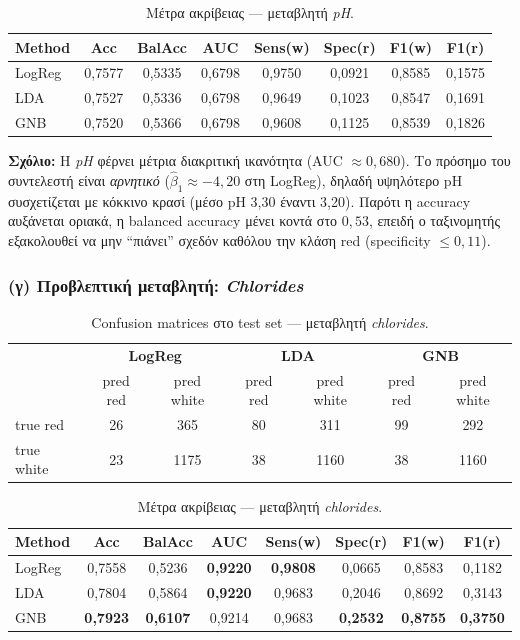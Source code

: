 \documentclass[11pt,a4paper]{article}
\begin{document}
\begin{table}[h!]
\centering
\caption{Μέτρα ακρίβειας — μεταβλητή \textit{pH}.}
\begin{tabular}{lccccccc}
\toprule
Method & Acc & BalAcc & AUC & Sens(w) & Spec(r) & F1(w) & F1(r) \\
\midrule
LogReg & 0,7577 & 0,5335 & 0,6798 & 0,9750 & 0,0921 & 0,8585 & 0,1575 \\
LDA    & 0,7527 & 0,5336 & 0,6798 & 0,9649 & 0,1023 & 0,8547 & 0,1691 \\
GNB    & 0,7520 & 0,5366 & 0,6798 & 0,9608 & 0,1125 & 0,8539 & 0,1826 \\
\bottomrule
\end{tabular}
\end{table}

\noindent
\textbf{Σχόλιο:} Η \textit{pH} φέρνει μέτρια διακριτική ικανότητα
(AUC $\approx 0{,}680$). Το πρόσημο του συντελεστή είναι \emph{αρνητικό}
($\hat{\beta}_1 \approx -4{,}20$ στη LogReg), δηλαδή υψηλότερο pH συσχετίζεται
με κόκκινο κρασί (μέσο pH 3,30 έναντι 3,20). Παρότι η accuracy
αυξάνεται οριακά, η balanced accuracy μένει κοντά στο $0{,}53$, επειδή ο
ταξινομητής εξακολουθεί να μην ``πιάνει'' σχεδόν καθόλου την κλάση red
(specificity $\le 0{,}11$).

\subsubsection*{(γ) Προβλεπτική μεταβλητή: \textit{Chlorides}}

\begin{table}[h!]
\centering
\caption{Confusion matrices στο test set — μεταβλητή \textit{chlorides}.}
\begin{tabular}{lcc|cc|cc}
\toprule
& \multicolumn{2}{c|}{\textbf{LogReg}} &
  \multicolumn{2}{c|}{\textbf{LDA}} &
  \multicolumn{2}{c}{\textbf{GNB}} \\
& pred red & pred white & pred red & pred white & pred red & pred white \\
\midrule
true red    & 26  & 365  & 80  & 311  & 99  & 292 \\
true white  & 23  & 1175 & 38  & 1160 & 38  & 1160 \\
\bottomrule
\end{tabular}
\end{table}

\begin{table}[h!]
\centering
\caption{Μέτρα ακρίβειας — μεταβλητή \textit{chlorides}.}
\begin{tabular}{lccccccc}
\toprule
Method & Acc & BalAcc & AUC & Sens(w) & Spec(r) & F1(w) & F1(r) \\
\midrule
LogReg & 0,7558 & 0,5236 & \textbf{0,9220} & \textbf{0,9808} & 0,0665 & 0,8583 & 0,1182 \\
LDA    & 0,7804 & 0,5864 & \textbf{0,9220} & 0,9683 & 0,2046 & 0,8692 & 0,3143 \\
GNB    & \textbf{0,7923} & \textbf{0,6107} & 0,9214 & 0,9683
       & \textbf{0,2532} & \textbf{0,8755} & \textbf{0,3750} \\
\bottomrule
\end{tabular}
\end{table}
\end{document}

